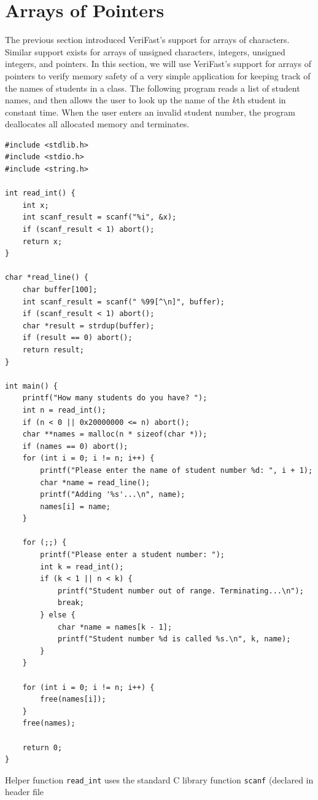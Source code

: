 \documentclass{article}
\begin{document}
\section{Arrays of Pointers}\label{section:arrays-of-pointers}

The previous section introduced VeriFast's support for arrays
of characters. Similar support exists for arrays of unsigned
characters, integers, unsigned integers, and pointers. In this
section, we will use VeriFast's support for arrays of pointers
to verify memory safety of a very simple application for
keeping track of the names of students in a class. The
following program reads a list of student names, and then
allows the user to look up the name of the $k$th student in
constant time. When the user enters an invalid student number,
the program deallocates all allocated memory and terminates.
\begin{lstlisting}
#include <stdlib.h>
#include <stdio.h>
#include <string.h>

int read_int() {
    int x;
    int scanf_result = scanf("%i", &x);
    if (scanf_result < 1) abort();
    return x;
}

char *read_line() {
    char buffer[100];
    int scanf_result = scanf(" %99[^\n]", buffer);
    if (scanf_result < 1) abort();
    char *result = strdup(buffer);
    if (result == 0) abort();
    return result;
}

int main() {
    printf("How many students do you have? ");
    int n = read_int();
    if (n < 0 || 0x20000000 <= n) abort();
    char **names = malloc(n * sizeof(char *));
    if (names == 0) abort();
    for (int i = 0; i != n; i++) {
        printf("Please enter the name of student number %d: ", i + 1);
        char *name = read_line();
        printf("Adding '%s'...\n", name);
        names[i] = name;
    }

    for (;;) {
        printf("Please enter a student number: ");
        int k = read_int();
        if (k < 1 || n < k) {
            printf("Student number out of range. Terminating...\n");
            break;
        } else {
            char *name = names[k - 1];
            printf("Student number %d is called %s.\n", k, name);
        }
    }

    for (int i = 0; i != n; i++) {
        free(names[i]);
    }
    free(names);

    return 0;
}
\end{lstlisting}
Helper function \lstinline!read_int! uses the standard C
library function \lstinline!scanf! (declared in header file
\end{document}
